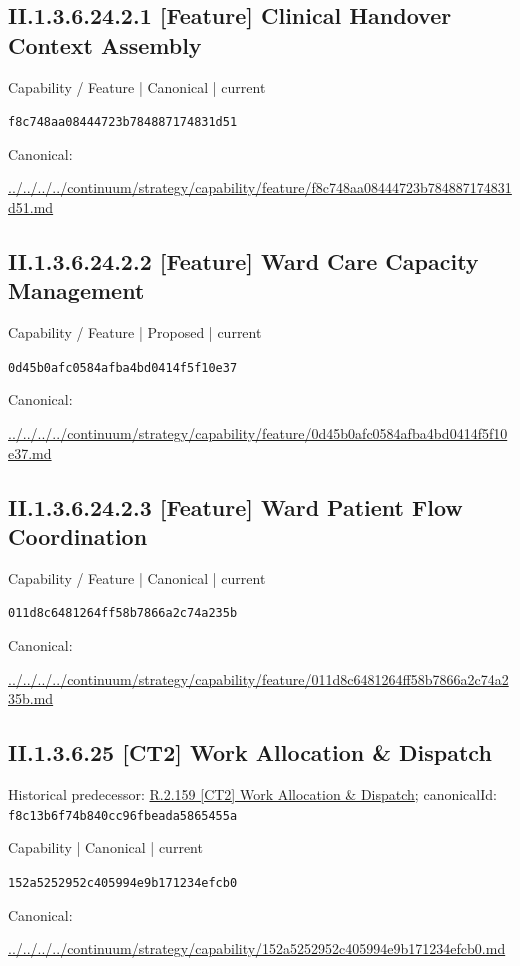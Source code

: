 \documentclass[10pt,a4paper]{article}
\begin{document}
\subsection*{II.1.3.6.24.2.1 [Feature] Clinical Handover Context Assembly}
\label{element-f8c748aa08444723b784887174831d51}
{\small Capability / Feature | Canonical | current}\par
\texttt{f8c748aa08444723b784887174831d51}\par
Canonical: \par
{\footnotesize\url{../../../../continuum/strategy/capability/feature/f8c748aa08444723b784887174831d51.md}}\par
\subsection*{II.1.3.6.24.2.2 [Feature] Ward Care Capacity Management}
\label{element-0d45b0afc0584afba4bd0414f5f10e37}
{\small Capability / Feature | Proposed | current}\par
\texttt{0d45b0afc0584afba4bd0414f5f10e37}\par
Canonical: \par
{\footnotesize\url{../../../../continuum/strategy/capability/feature/0d45b0afc0584afba4bd0414f5f10e37.md}}\par
\subsection*{II.1.3.6.24.2.3 [Feature] Ward Patient Flow Coordination}
\label{element-011d8c6481264ff58b7866a2c74a235b}
{\small Capability / Feature | Canonical | current}\par
\texttt{011d8c6481264ff58b7866a2c74a235b}\par
Canonical: \par
{\footnotesize\url{../../../../continuum/strategy/capability/feature/011d8c6481264ff58b7866a2c74a235b.md}}\par
\subsection*{II.1.3.6.25 [CT2] Work Allocation \& Dispatch}
Historical predecessor: \hyperref[element-f8c13b6f74b840cc96fbeada5865455a]{R.2.159 [CT2] Work Allocation \& Dispatch}; canonicalId: \texttt{f8c13b6f74b840cc96fbeada5865455a}\par
\label{element-152a5252952c405994e9b171234efcb0}
{\small Capability | Canonical | current}\par
\texttt{152a5252952c405994e9b171234efcb0}\par
Canonical: \par
{\footnotesize\url{../../../../continuum/strategy/capability/152a5252952c405994e9b171234efcb0.md}}\par
\end{document}
